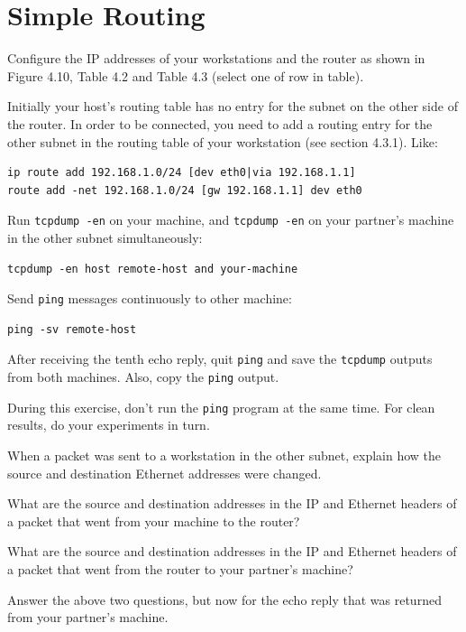 \documentclass{../UTNetLab}
\begin{document}
\section{Simple Routing}
    Configure the IP addresses of your workstations and the router as shown in Figure 4.10, Table 4.2 and Table 4.3 (select one of row in table).

    Initially your host’s routing table has no entry for the subnet on the other side of the router.
    In order to be connected, you need to add a routing entry for the other subnet in the routing table of your workstation (see section 4.3.1).
    Like:
    \begin{lstlisting}
ip route add 192.168.1.0/24 [dev eth0|via 192.168.1.1]
route add -net 192.168.1.0/24 [gw 192.168.1.1] dev eth0
    \end{lstlisting}

    Run \lstinline{tcpdump -en} on your machine, and \lstinline{tcpdump -en} on your partner’s machine in the other subnet simultaneously:
    \begin{lstlisting}[emph={your-host, remote-host}]
tcpdump -en host remote-host and your-machine
    \end{lstlisting}
    Send \lstinline{ping} messages continuously to other machine:
    \begin{lstlisting}[emph={your-host, remote-host}]
ping -sv remote-host
    \end{lstlisting}
    After receiving the tenth echo reply, quit \lstinline{ping} and save the \lstinline{tcpdump} outputs from both machines.
    Also, copy the \lstinline{ping} output.

    During this exercise, don’t run the \lstinline{ping} program at the same time.
    For clean results, do your experiments in turn.
    
    \begin{report}
    \item When a packet was sent to a workstation in the other subnet, explain how the source and destination Ethernet addresses were changed.
    
    \item What are the source and destination addresses in the IP and Ethernet headers of a packet that went from your machine to the router?
    
    \item What are the source and destination addresses in the IP and Ethernet headers of a packet that went from the router to your partner’s machine?
    
    \item Answer the above two questions, but now for the echo reply that was returned from your partner’s machine.
    \end{report}
    
\end{document}
